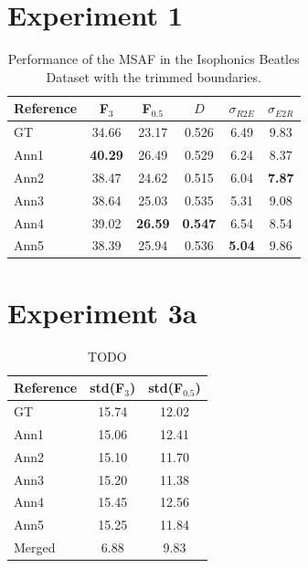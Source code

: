 \documentclass{article}
\begin{document}
\section{Experiment 1}

\begin{table}
 \begin{center}
   \begin{tabular}{|l|c|c|c|c|c|}
  \hline
  Reference & F$_3$ & F$_{0.5}$ & $D$ & $\sigma_{R2E}$ & $\sigma_{E2R}$\\
  \hline
  GT          & 34.66 & 23.17 & 0.526 & 6.49 & 9.83 \\
  Ann1        & \textbf{40.29} & 26.49 & 0.529 & 6.24 & 8.37 \\
  Ann2        & 38.47 & 24.62 & 0.515 & 6.04 & \textbf{7.87} \\
  Ann3        & 38.64 & 25.03 & 0.535 & 5.31 & 9.08 \\
  Ann4        & 39.02 & \textbf{26.59} & \textbf{0.547} & 6.54 & 8.54 \\
  Ann5        & 38.39 & 25.94 & 0.536 & \textbf{5.04} & 9.86 \\
  \hline
 \end{tabular}
\end{center}
 \caption{Performance of the MSAF in the Isophonics Beatles Dataset with the trimmed boundaries.}
 \label{tab:experiment1}
\end{table}

\section{Experiment 3a}

\begin{table}
 \begin{center}
   \begin{tabular}{|l|c|c|}
  \hline
  Reference & std(F$_3$) & std(F$_{0.5}$) \\
  \hline
  GT          & 15.74 & 12.02 \\
  Ann1        & 15.06 & 12.41 \\
  Ann2        & 15.10 & 11.70 \\
  Ann3        & 15.20 & 11.38 \\
  Ann4        & 15.45 & 12.56 \\
  Ann5        & 15.25 & 11.84 \\
  \hline
  Merged      & 6.88 & 9.83 \\
  \hline
 \end{tabular}
\end{center}
 \caption{TODO}
 \label{tab:experiment3a}
\end{table}
\end{document}
